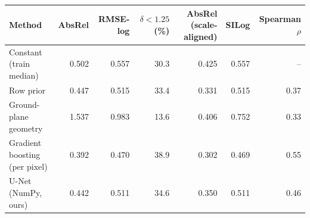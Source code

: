 \begin{tabular}{lrrrrrr}
\toprule
Method & AbsRel & RMSE-log & $\delta<1.25$ (\%) & AbsRel (scale-aligned) & SILog & Spearman $\rho$ \\
\midrule
Constant (train median) & 0.502 & 0.557 & 30.3 & 0.425 & 0.557 & -- \\
Row prior & 0.447 & 0.515 & 33.4 & 0.331 & 0.515 & 0.37 \\
Ground-plane geometry & 1.537 & 0.983 & 13.6 & 0.406 & 0.752 & 0.33 \\
Gradient boosting (per pixel) & 0.392 & 0.470 & 38.9 & 0.302 & 0.469 & 0.55 \\
U-Net (NumPy, ours) & 0.442 & 0.511 & 34.6 & 0.350 & 0.511 & 0.46 \\
\bottomrule
\end{tabular}
